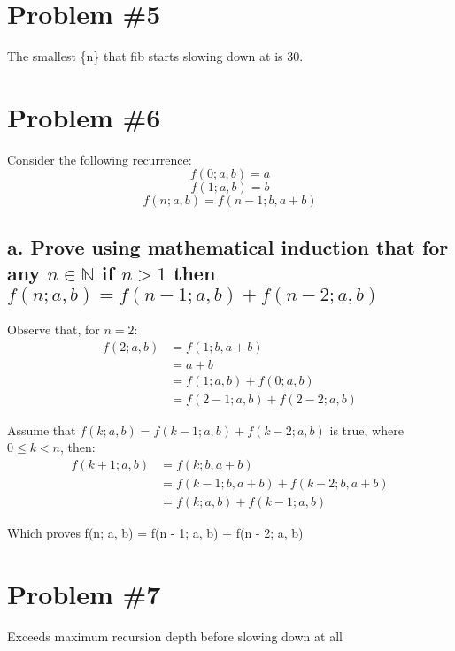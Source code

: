 \documentclass{article}
\newcommand {\N}{\mathbb{N}}
\begin{document}
\section*{Problem \#5}
The smallest \{n\} that fib starts slowing down at is 30.

\section*{Problem \#6}
Consider the following recurrence:
\[f(0; a, b) = a\]
\[f(1; a, b) = b\]
\[f(n; a, b) = f(n - 1; b, a + b)\]
\subsection*{a. Prove using mathematical induction that for any \(n \in \N\) if \(n > 1\) then \(f(n; a, b) = f(n - 1; a, b) + f(n - 2; a, b)\)}
Observe that, for \(n = 2\):
\begin{align}
f(2; a, b) &= f(1; b, a + b)\\
&= a + b\\
&= f(1; a, b) + f(0; a, b)\\
&= f(2 - 1; a, b) + f(2 - 2; a, b)
\end{align}

Assume that \(f(k; a, b) = f(k - 1; a, b) + f(k - 2; a, b)\) is true, where \(0 \leq k < n\), then:
\begin{align}
f(k + 1; a, b) &= f(k; b, a + b)\\
&= f(k - 1; b, a + b) + f(k - 2; b, a + b)\\
&= f(k; a, b) + f(k - 1; a, b)
\end{align}

Which proves f(n; a, b) = f(n - 1; a, b) + f(n - 2; a, b)

\section*{Problem \#7}
Exceeds maximum recursion depth before slowing down at all
\end{document}
